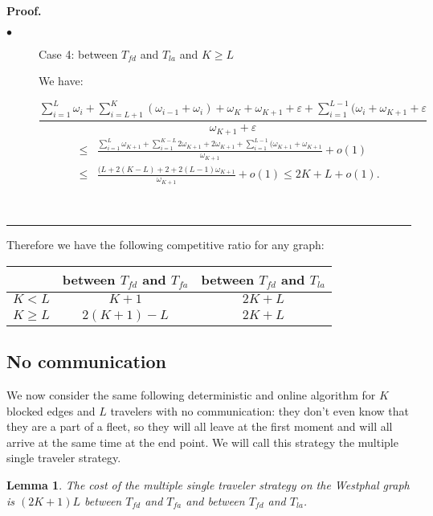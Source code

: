 \documentclass[letter-size, 11pt]{article}
\newtheorem{lemma}{Lemma}
\newenvironment{proof}[1][Proof]{\textbf{#1.} }{\ \rule{0.5em}{0.5em}}
\begin{document}
\begin{proof}
\begin{description}
\item[$\bullet$] Case 4: between $T_{fd}$ and $T_{la}$ and $K \geq L$

We have:

\[
\frac {\sum_{i=1}^{L} \omega_{i} + \sum_{i=L+1}^{K}(\omega_{i-1} + \omega_{i} ) + \omega_{K} + \omega_{K+1} + \varepsilon + \sum_{i=1}^{L-1}(\omega_{i} + \omega_{K+1} + \varepsilon } {\omega_{K+1} + \varepsilon} 
\]
\begin{eqnarray}
&\leq& \frac {\sum_{i=1}^{L} \omega_{K+1} + \sum_{i=1}^{K-L}2\omega_{K+1} + 2\omega_{K+1} + \sum_{i=1}^{L-1}(\omega_{K+1} + \omega_{K+1}} {\omega_{K+1}} + o(1) \nonumber\\
&\leq& \frac {(L + 2(K - L) + 2 + 2(L-1)\omega_{K+1}}{\omega_{K+1}} + o(1)
 \leq 2K + L + o(1).\nonumber
\end{eqnarray}

\end{description}
\end{proof}

Therefore we have the following competitive ratio for any graph:

\begin{center}
\begin{tabular}{|c|c|c|}
\hline
 & between $T_{fd}$ and $T_{fa}$  & between $T_{fd}$ and $ T_{la}$ \\ 
\hline
 ${K<L}$  & ${K + 1}$ & ${ 2K + L}$   \\ 
\hline
 ${K \geq L}$  & ${2(K+1) - L}$ & ${2K + L}$   \\ 
\hline
\end{tabular}
\end{center}

\subsection{No communication}
We now consider the same following deterministic and online algorithm for $K$ blocked edges and $L$ travelers with no communication: they don't even know that they are a part of a fleet, so they will all leave at the first moment and will all arrive at the same time at the end point. We will call this strategy the multiple single traveler strategy.

\begin{lemma} The cost of the multiple single traveler strategy on the Westphal graph is $(2K+1)L$ between $T_{fd}$ and $T_{fa}$ and between $T_{fd}$ and $T_{la}$.
\end{lemma}
\end{document}
